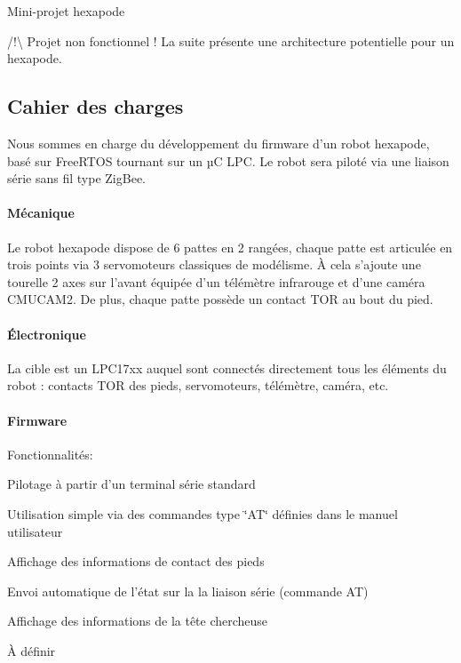 Mini-\/projet hexapode

/!\textbackslash{} Projet non fonctionnel ! La suite présente une architecture potentielle pour un hexapode.





\subsection*{Cahier des charges}

Nous sommes en charge du développement du firmware d'un robot hexapode, basé sur Free\-R\-T\-O\-S tournant sur un µ\-C L\-P\-C. Le robot sera piloté via une liaison série sans fil type Zig\-Bee.

\paragraph*{Mécanique}

Le robot hexapode dispose de 6 pattes en 2 rangées, chaque patte est articulée en trois points via 3 servomoteurs classiques de modélisme. À cela s'ajoute une tourelle 2 axes sur l'avant équipée d'un télémètre infrarouge et d'une caméra C\-M\-U\-C\-A\-M2. De plus, chaque patte possède un contact T\-O\-R au bout du pied.

\paragraph*{Électronique}

La cible est un L\-P\-C17xx auquel sont connectés directement tous les éléments du robot \-: contacts T\-O\-R des pieds, servomoteurs, télémètre, caméra, etc.

\paragraph*{Firmware}

Fonctionnalités\-:


\begin{DoxyItemize}
\item Pilotage à partir d'un terminal série standard
\begin{DoxyItemize}
\item Utilisation simple via des commandes type \char`\"{}\-A\-T\char`\"{} définies dans le manuel utilisateur
\end{DoxyItemize}
\item Affichage des informations de contact des pieds
\begin{DoxyItemize}
\item Envoi automatique de l'état sur la la liaison série (commande A\-T)
\end{DoxyItemize}
\item Affichage des informations de la tête chercheuse
\begin{DoxyItemize}
\item À définir
\end{DoxyItemize}
\end{DoxyItemize}

